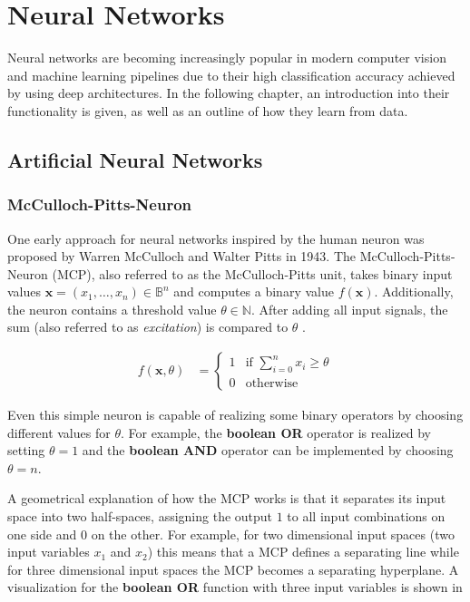 \section{Neural Networks}
Neural networks are becoming increasingly popular in modern computer vision and machine learning pipelines due to their high classification accuracy achieved by using deep architectures.
In the following chapter, an introduction into their functionality is given, as well as an outline of how they learn from data.

\subsection{Artificial Neural Networks}

\subsubsection{McCulloch-Pitts-Neuron}
One early approach for neural networks inspired by the human neuron was proposed by Warren McCulloch and Walter Pitts in 1943.
The McCulloch-Pitts-Neuron (MCP), also referred to as the McCulloch-Pitts unit, takes binary input values $\bm{x} = (x_1, \dots, x_n) \in \mathbb{B}^n$ and computes a binary value $f(\bm{x})$.
Additionally, the neuron contains a threshold value $\theta \in \mathbb{N}$.
After adding all input signals, the sum (also referred to as \textit{excitation}) is compared to $\theta$ .

\begin{equation}
    \begin{split}
        \label{eq:mcculloch-binary}
        f(\bm{x}, \theta)
        &=
        \begin{cases}
            1 & \text{if } \sum_{i=0}^n x_i \geq \theta \\
            0 & \text{otherwise}
        \end{cases}
    \end{split}
\end{equation}

Even this simple neuron is capable of realizing some binary operators by choosing different values for $\theta$.
For example, the \textbf{boolean OR} operator is realized by setting $\theta = 1$ and the \textbf{boolean AND} operator can be implemented by choosing $\theta = n$.

A geometrical explanation of how the MCP works is that it separates its input space into two half-spaces, assigning the output $1$ to all input combinations on one side and $0$ on the other.
For example, for two dimensional input spaces (two input variables $x_1$ and $x_2$) this means that a MCP defines a separating line while for three dimensional input spaces the MCP becomes a separating hyperplane.
A visualization for the \textbf{boolean OR} function with three input variables is shown in 

